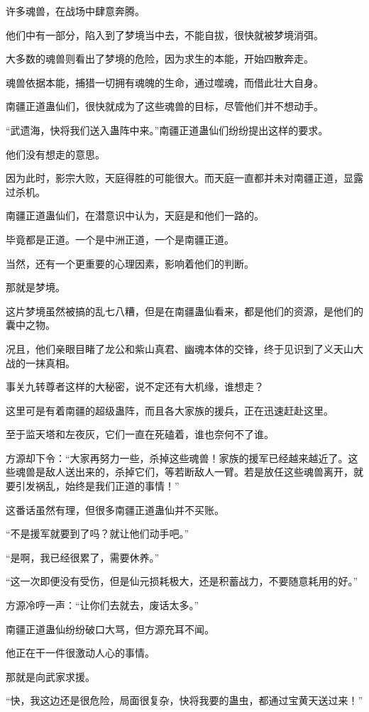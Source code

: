 \begin{this_body}
许多魂兽，在战场中肆意奔腾。

他们中有一部分，陷入到了梦境当中去，不能自拔，很快就被梦境消弭。

大多数的魂兽则看出了梦境的危险，因为求生的本能，开始四散奔走。

魂兽依据本能，捕猎一切拥有魂魄的生命，通过噬魂，而借此壮大自身。

南疆正道蛊仙们，很快就成为了这些魂兽的目标，尽管他们并不想动手。

“武遗海，快将我们送入蛊阵中来。”南疆正道蛊仙们纷纷提出这样的要求。

他们没有想走的意思。

因为此时，影宗大败，天庭得胜的可能很大。而天庭一直都并未对南疆正道，显露过杀机。

南疆正道蛊仙们，在潜意识中认为，天庭是和他们一路的。

毕竟都是正道。一个是中洲正道，一个是南疆正道。

当然，还有一个更重要的心理因素，影响着他们的判断。

那就是梦境。

这片梦境虽然被搞的乱七八糟，但是在南疆蛊仙看来，都是他们的资源，是他们的囊中之物。

况且，他们亲眼目睹了龙公和紫山真君、幽魂本体的交锋，终于见识到了义天山大战的一抹真相。

事关九转尊者这样的大秘密，说不定还有大机缘，谁想走？

这里可是有着南疆的超级蛊阵，而且各大家族的援兵，正在迅速赶赴这里。

至于监天塔和左夜灰，它们一直在死磕着，谁也奈何不了谁。

方源却下令：“大家再努力一些，杀掉这些魂兽！家族的援军已经越来越近了。这些魂兽是敌人送出来的，杀掉它们，等若断敌人一臂。若是放任这些魂兽离开，就要引发祸乱，始终是我们正道的事情！”

这番话虽然有理，但很多南疆正道蛊仙并不买账。

“不是援军就要到了吗？就让他们动手吧。”

“是啊，我已经很累了，需要休养。”

“这一次即便没有受伤，但是仙元损耗极大，还是积蓄战力，不要随意耗用的好。”

方源冷哼一声：“让你们去就去，废话太多。”

南疆正道蛊仙纷纷破口大骂，但方源充耳不闻。

他正在干一件很激动人心的事情。

那就是向武家求援。

“快，我这边还是很危险，局面很复杂，快将我要的蛊虫，都通过宝黄天送过来！”


\end{this_body}
